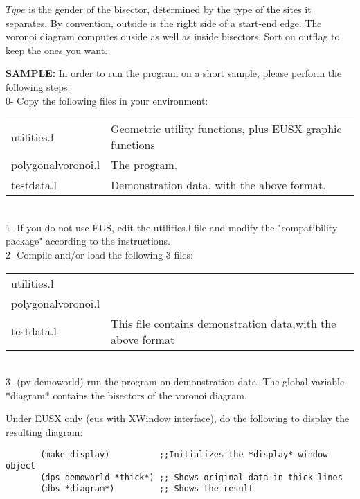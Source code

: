 \begin{refdesc}
$Type$ is the gender of the bisector, determined by the type of the sites
it separates.
By convention, outside is the right side of a start-end edge.
The voronoi diagram computes ouside as well as inside bisectors.
Sort on outflag to keep the ones you want.

{\bf SAMPLE:}
In order to run the program on a short  sample, 
please perform the following steps:
\\
0- Copy the following files in your environment:
\\
\begin{tabular}{ll}
utilities.l & Geometric utility functions, plus EUSX graphic functions\\
polygonalvoronoi.l & The program.\\
testdata.l & Demonstration data, with the above format.  
\end{tabular}
\\
1- If you do not use EUS, edit the utilities.l file and
modify the "compatibility package" according to the instructions.
\\
2- Compile and/or load the following 3 files:
\\
\begin{tabular}{ll}
utilities.l\\
polygonalvoronoi.l\\
testdata.l & This file contains demonstration data,with the above format
\end{tabular}
\\
3- (pv demoworld)  run the program on demonstration data. 
The global variable *diagram* contains the bisectors of the voronoi diagram.

Under EUSX only (eus with XWindow interface), do the following
to display the resulting diagram:
\begin{verbatim}
       (make-display)          ;;Initializes the *display* window object
       (dps demoworld *thick*) ;; Shows original data in thick lines
       (dbs *diagram*)         ;; Shows the result
\end{verbatim}

\begin{refdesc}
\end{refdesc}

\end{refdesc}

\newpage
